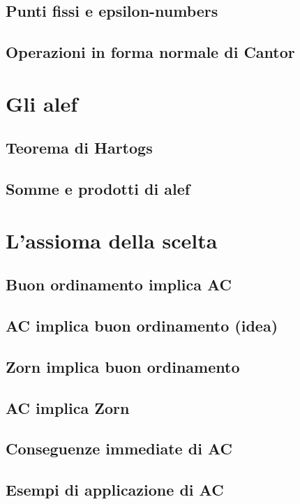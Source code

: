 \documentclass[11pt]{scrartcl}
\begin{document}
\subsection{Punti fissi e epsilon-numbers}
\newpage
\subsection{Operazioni in forma normale di Cantor}
\newpage





\newpage
\section{Gli alef}
\subsection{Teorema di Hartogs}
\newpage
\subsection{Somme e prodotti di alef}



\newpage
\section{L'assioma della scelta}
\subsection{Buon ordinamento implica AC}
\newpage
\subsection{AC implica buon ordinamento (idea)}
\newpage
\subsection{Zorn implica buon ordinamento}
\newpage
\subsection{AC implica Zorn}
\newpage
\subsection{Conseguenze immediate di AC}
\newpage
\subsection{Esempi di applicazione di AC}
\newpage
\end{document}
